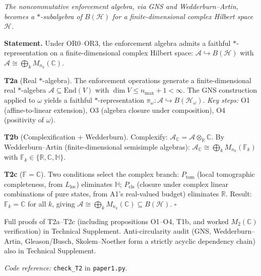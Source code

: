 \documentclass[11pt]{article}
\theoremstyle{remark}
\newcommand{\coderef}[2]{\smallskip\noindent\textit{Code reference:} \texttt{#1} in \texttt{#2}.}
\begin{document}
\begin{tcolorbox}[apfbox, title={T2: Noncommutativity $\to$ Operator Algebra on Hilbert Space}]
\textit{The noncommutative enforcement algebra, via GNS and Wedderburn--Artin, becomes a $*$-subalgebra of $B(\mathcal{H})$ for a finite-dimensional complex Hilbert space $\mathcal{H}$.}

\smallskip\noindent\textbf{Statement.}  Under OR0--OR3, the enforcement algebra admits a faithful $*$-representation on a finite-dimensional complex Hilbert space: $\mathcal{A} \hookrightarrow B(\mathcal{H})$ with $\mathcal{A} \cong \bigoplus_k M_{n_k}(\mathbb{C})$.

\smallskip\noindent\textbf{T2a} (Real $*$-algebra).  The enforcement operations generate a finite-dimensional real $*$-algebra $\mathcal{A} \subseteq \mathrm{End}(V)$ with $\dim V \le n_{\max} + 1 < \infty$.  The GNS construction applied to $\omega$ yields a faithful $*$-representation $\pi_\omega: \mathcal{A} \hookrightarrow B(\mathcal{H}_\omega)$.  \textit{Key steps:} O1 (affine-to-linear extension), O3 (algebra closure under composition), O4 (positivity of $\omega$).

\smallskip\noindent\textbf{T2b} (Complexification + Wedderburn).  Complexify: $\mathcal{A}_\mathbb{C} = \mathcal{A} \otimes_\mathbb{R} \mathbb{C}$.  By Wedderburn--Artin (finite-dimensional semisimple algebras): $\mathcal{A}_\mathbb{C} \cong \bigoplus_k M_{n_k}(\mathbb{F}_k)$ with $\mathbb{F}_k \in \{\mathbb{R}, \mathbb{C}, \mathbb{H}\}$.

\smallskip\noindent\textbf{T2c} ($\mathbb{F} = \mathbb{C}$).  Two conditions select the complex branch: $P_{\mathrm{tom}}$ (local tomographic completeness, from $L_{\mathrm{loc}}$) eliminates $\mathbb{H}$; $P_{\mathrm{cls}}$ (closure under complex linear combinations of pure states, from A1's real-valued budget) eliminates $\mathbb{R}$.  Result: $\mathbb{F}_k = \mathbb{C}$ for all $k$, giving $\mathcal{A} \cong \bigoplus_k M_{n_k}(\mathbb{C}) \subseteq B(\mathcal{H})$.  \hfill$\square$

\smallskip\noindent Full proofs of T2a--T2c (including propositions O1--O4, T1b, and worked $M_2(\mathbb{C})$ verification) in Technical Supplement.  Anti-circularity audit (GNS, Wedderburn--Artin, Gleason/Busch, Skolem--Noether form a strictly acyclic dependency chain) also in Technical Supplement.

\coderef{check\_T2}{paper1.py}
\end{tcolorbox}
\end{document}
